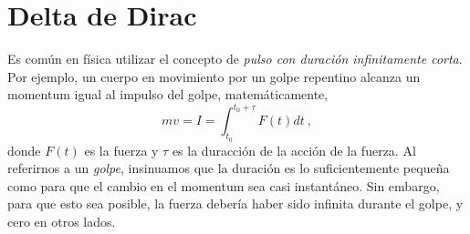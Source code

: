      
     


\section{Delta de Dirac}

Es común en física utilizar el concepto de \emph{pulso con duración infinitamente corta}. Por ejemplo, un cuerpo en movimiento por un golpe repentino alcanza un momentum igual al impulso del golpe, matemáticamente,
\begin{equation*}
    mv = I = \int_{t_0}^{t_0+\tau} F(t) dt \ ,
\end{equation*}
donde $F(t)$ es la fuerza y $\tau$ es la duracción de la acción de la fuerza. Al referirnos a un \emph{golpe}, insinuamos que la duración es lo suficientemente pequeña como para que el cambio en el momentum sea casi instantáneo. Sin embargo, para que esto sea posible, la fuerza debería haber sido infinita durante el golpe, y cero en otros lados.

